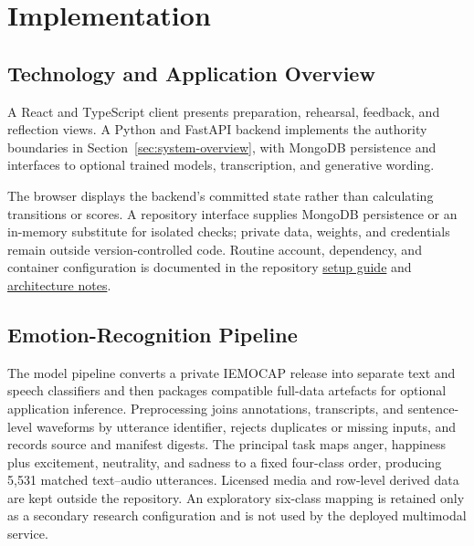 \chapter{Implementation}
\label{chap:implementation}

\section{Technology and Application Overview}
\label{sec:implementation-overview}
\label{sec:technology-stack}

A React and TypeScript client presents preparation, rehearsal, feedback, and reflection views. A Python and FastAPI backend implements the authority boundaries in Section~\ref{sec:system-overview}, with MongoDB persistence and interfaces to optional trained models, transcription, and generative wording.

The browser displays the backend's committed state rather than calculating transitions or scores. A repository interface supplies MongoDB persistence or an in-memory substitute for isolated checks; private data, weights, and credentials remain outside version-controlled code. Routine account, dependency, and container configuration is documented in the repository \href{https://github.com/ralucabiras/emotion-aware-role-play-model/blob/main/README.md}{setup guide} and \href{https://github.com/ralucabiras/emotion-aware-role-play-model/blob/main/docs/architecture.md}{architecture notes}.

\section{Emotion-Recognition Pipeline}
\label{sec:emotion-recognition-pipeline}

The model pipeline converts a private IEMOCAP release into separate text and speech classifiers and then packages compatible full-data artefacts for optional application inference. Preprocessing joins annotations, transcripts, and sentence-level waveforms by utterance identifier, rejects duplicates or missing inputs, and records source and manifest digests. The principal task maps anger, happiness plus excitement, neutrality, and sadness to a fixed four-class order, producing 5,531 matched text--audio utterances. Licensed media and row-level derived data are kept outside the repository. An exploratory six-class mapping is retained only as a secondary research configuration and is not used by the deployed multimodal service.

